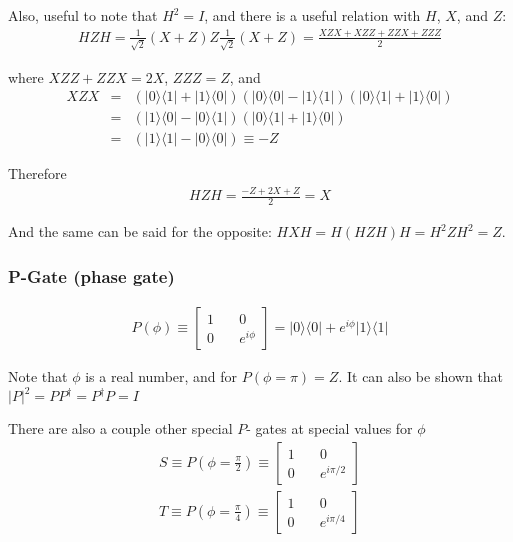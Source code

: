 \documentclass[preprint,aps,prd,nofootinbib,superscriptaddress]{revtex4-2}
\begin{document}
Also, useful to note that $H^2 = I$, and there is a useful relation with $H$, $X$, and $Z$:
%
\begin{eqnarray}
HZH = \frac{1}{\sqrt{2}} (X + Z) Z \frac{1}{\sqrt{2}} (X + Z) = \frac{XZX + XZZ + ZZX + ZZZ}{2} 
\end{eqnarray}

where $XZZ + ZZX = 2X$, $ZZZ = Z$, and 
%
\begin{eqnarray}
XZX &=& (|0 \rangle \langle 1| + |1 \rangle \langle 0|)(|0 \rangle \langle 0| - |1 \rangle \langle 1|)(|0 \rangle \langle 1| + |1 \rangle \langle 0|)
\nonumber \\
&=& (|1 \rangle \langle 0| - |0 \rangle \langle 1|)(|0 \rangle \langle 1| + |1 \rangle \langle 0|)
\nonumber \\
&=& (|1 \rangle \langle 1| - |0 \rangle \langle 0|) \equiv -Z
\end{eqnarray}

Therefore
%
\begin{eqnarray}
HZH = \frac{-Z + 2X + Z}{2} = X 
\end{eqnarray}

And the same can be said for the opposite: $HXH = H(HZH)H = H^2 Z H^2 = Z$.

\subsubsection{P-Gate (phase gate)}
%
\begin{eqnarray}
P(\phi) \equiv 
\begin{bmatrix} 
1 \quad & 0 \\ 
0 \quad & e^{i\phi} 
\end{bmatrix} 
= |0 \rangle \langle 0| + e^{i\phi}|1 \rangle \langle 1|
\end{eqnarray}

Note that $\phi$ is a real number, and for $P(\phi = \pi) = Z$. It can also be shown that $|P|^2 = PP^\dagger = P^\dagger P = I$
%

%
There are also a couple other special $P$- gates at special values for $\phi$
%
\begin{eqnarray}
S \equiv P\left(\phi = \frac{\pi}{2}\right) \equiv 
\begin{bmatrix} 
1 \quad & 0 \\ 
0 \quad & e^{i\pi/2} 
\end{bmatrix}
\nonumber \\
T \equiv P\left(\phi = \frac{\pi}{4}\right) \equiv 
\begin{bmatrix} 
1 \quad & 0 \\
0 \quad & e^{i\pi/4} 
\end{bmatrix}
\end{eqnarray}
\end{document}
